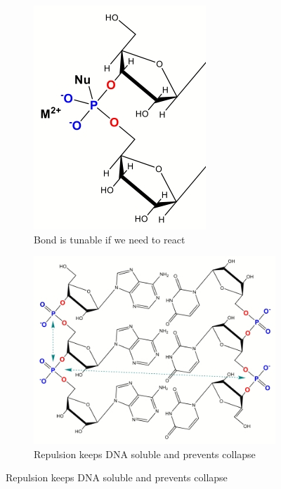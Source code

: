 \documentclass[]{article}
\begin{document}
\begin{figure}[H]
\begin{subfigure}[b]{0.45\textwidth}
	\end{subfigure}
	\begin{subfigure}[b]{0.45\textwidth}
		\centering
		\caption{Bond is tunable if we need to react}\label{fig:PhosphoDiesterBond2} 
		\includegraphics[width=\textwidth]{PhosphoDiesterBond2}
	\end{subfigure}
	\begin{subfigure}[b]{0.45\textwidth}
		\centering
		\caption{Repulsion keeps DNA soluble and prevents collapse}\label{fig:PhosphoDiesterBond3} 
		\includegraphics[width=\textwidth]{PhosphoDiesterBond3}
	\end{subfigure}
	
\end{figure}
\end{document}
